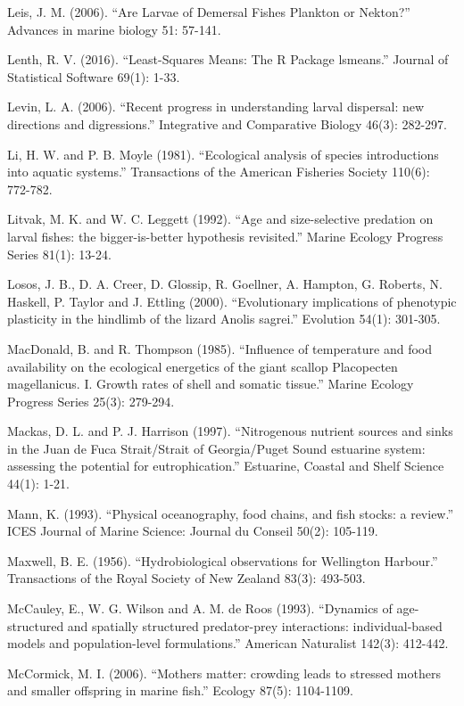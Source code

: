 \documentclass[]{book}
\begin{document}
Leis, J. M. (2006). ``Are Larvae of Demersal Fishes Plankton or
Nekton?'' Advances in marine biology 51: 57-141.

Lenth, R. V. (2016). ``Least-Squares Means: The R Package lsmeans.''
Journal of Statistical Software 69(1): 1-33.

Levin, L. A. (2006). ``Recent progress in understanding larval
dispersal: new directions and digressions.'' Integrative and Comparative
Biology 46(3): 282-297.

Li, H. W. and P. B. Moyle (1981). ``Ecological analysis of species
introductions into aquatic systems.'' Transactions of the American
Fisheries Society 110(6): 772-782.

Litvak, M. K. and W. C. Leggett (1992). ``Age and size-selective
predation on larval fishes: the bigger-is-better hypothesis revisited.''
Marine Ecology Progress Series 81(1): 13-24.

Losos, J. B., D. A. Creer, D. Glossip, R. Goellner, A. Hampton, G.
Roberts, N. Haskell, P. Taylor and J. Ettling (2000). ``Evolutionary
implications of phenotypic plasticity in the hindlimb of the lizard
Anolis sagrei.'' Evolution 54(1): 301-305.

MacDonald, B. and R. Thompson (1985). ``Influence of temperature and
food availability on the ecological energetics of the giant scallop
Placopecten magellanicus. I. Growth rates of shell and somatic tissue.''
Marine Ecology Progress Series 25(3): 279-294.

Mackas, D. L. and P. J. Harrison (1997). ``Nitrogenous nutrient sources
and sinks in the Juan de Fuca Strait/Strait of Georgia/Puget Sound
estuarine system: assessing the potential for eutrophication.''
Estuarine, Coastal and Shelf Science 44(1): 1-21.

Mann, K. (1993). ``Physical oceanography, food chains, and fish stocks:
a review.'' ICES Journal of Marine Science: Journal du Conseil 50(2):
105-119.

Maxwell, B. E. (1956). ``Hydrobiological observations for Wellington
Harbour.'' Transactions of the Royal Society of New Zealand 83(3):
493-503.

McCauley, E., W. G. Wilson and A. M. de Roos (1993). ``Dynamics of
age-structured and spatially structured predator-prey interactions:
individual-based models and population-level formulations.'' American
Naturalist 142(3): 412-442.

McCormick, M. I. (2006). ``Mothers matter: crowding leads to stressed
mothers and smaller offspring in marine fish.'' Ecology 87(5):
1104-1109.
\end{document}

